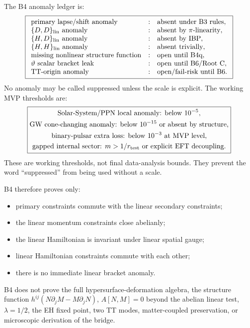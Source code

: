 \documentclass[11pt]{article}
\begin{document}
The B4 anomaly ledger is:
\[
\boxed{
\begin{array}{lll}
\text{primary lapse/shift anomaly} &:& \text{absent under B3 rules},\\
\{D,D\}_{\rm lin}\ \text{anomaly} &:& \text{absent by }\pi\text{-linearity},\\
\{H,D\}_{\rm lin}\ \text{anomaly} &:& \text{absent by IBP},\\
\{H,H\}_{\rm lin}\ \text{anomaly} &:& \text{absent trivially},\\
\text{missing nonlinear structure function} &:& \text{open until B4q},\\
\vartheta\ \text{scalar bracket leak} &:& \text{open until B6/Root~C},\\
\text{TT-origin anomaly} &:& \text{open/fail-risk until B6}.
\end{array}}
\]
No anomaly may be called suppressed unless the scale is explicit.  The working
MVP thresholds are:
\[
\boxed{
\begin{gathered}
\text{Solar-System/PPN local anomaly: below }10^{-5},\\
\text{GW cone-changing anomaly: below }10^{-15}\text{ or absent by structure},\\
\text{binary-pulsar extra loss: below }10^{-3}\text{ at MVP level},\\
\text{gapped internal sector: }m>1/r_{\rm test}
\text{ or explicit EFT decoupling.}
\end{gathered}}
\]
These are working thresholds, not final data-analysis bounds.  They prevent
the word ``suppressed'' from being used without a scale.

B4 therefore proves only:
\begin{itemize}
\item primary constraints commute with the linear secondary constraints;
\item the linear momentum constraints close abelianly;
\item the linear Hamiltonian is invariant under linear spatial gauge;
\item linear Hamiltonian constraints commute with each other;
\item there is no immediate linear bracket anomaly.
\end{itemize}
B4 does not prove the full hypersurface-deformation algebra, the structure
function \(h^{ij}(N\partial_jM-M\partial_jN)\), \(A[N,M]=0\) beyond the
abelian linear test, \(\lambda=1/2\), the EH fixed point, two TT modes,
matter-coupled preservation, or microscopic derivation of the bridge.
\end{document}
